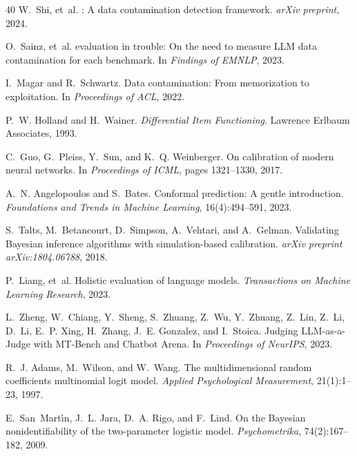 \documentclass[11pt,a4paper]{article}
\begin{document}
\begin{thebibliography}{40}
W.~Shi, et~al.
: A data contamination detection framework.
\newblock \emph{arXiv preprint}, 2024.

O.~Sainz, et~al.
 evaluation in trouble: On the need to measure {LLM} data contamination for each benchmark.
\newblock In \emph{Findings of EMNLP}, 2023.

I.~Magar and R.~Schwartz.
\newblock Data contamination: From memorization to exploitation.
\newblock In \emph{Proceedings of ACL}, 2022.

P.~W. Holland and H.~Wainer.
\newblock \emph{Differential Item Functioning}.
\newblock Lawrence Erlbaum Associates, 1993.

C.~Guo, G.~Pleiss, Y.~Sun, and K.~Q. Weinberger.
\newblock On calibration of modern neural networks.
\newblock In \emph{Proceedings of ICML}, pages 1321--1330, 2017.

A.~N. Angelopoulos and S.~Bates.
\newblock Conformal prediction: A gentle introduction.
\newblock \emph{Foundations and Trends in Machine Learning}, 16(4):494--591, 2023.

S.~Talts, M.~Betancourt, D.~Simpson, A.~Vehtari, and A.~Gelman.
\newblock Validating {Bayesian} inference algorithms with simulation-based calibration.
\newblock \emph{arXiv preprint arXiv:1804.06788}, 2018.

P.~Liang, et~al.
\newblock Holistic evaluation of language models.
\newblock \emph{Transactions on Machine Learning Research}, 2023.

L.~Zheng, W.~Chiang, Y.~Sheng, S.~Zhuang, Z.~Wu, Y.~Zhuang, Z.~Lin, Z.~Li, D.~Li, E.~P. Xing, H.~Zhang, J.~E. Gonzalez, and I.~Stoica.
\newblock Judging {LLM-as-a-Judge} with {MT-Bench} and {Chatbot Arena}.
\newblock In \emph{Proceedings of NeurIPS}, 2023.

R.~J. Adams, M.~Wilson, and W.~Wang.
\newblock The multidimensional random coefficients multinomial logit model.
\newblock \emph{Applied Psychological Measurement}, 21(1):1--23, 1997.

E.~San~Mart{\'\i}n, J.~L. Jara, D.~A. Rigo, and F.~Lind.
\newblock On the {Bayesian} nonidentifiability of the two-parameter logistic model.
\newblock \emph{Psychometrika}, 74(2):167--182, 2009.


\end{thebibliography}
\end{document}
